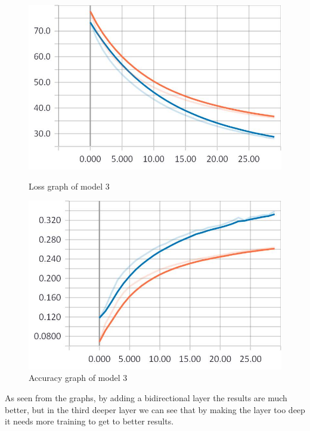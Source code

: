 \begin{figure}
\centering
\begin{minipage}{.5\textwidth}
	\centering
	\includegraphics[width=1\linewidth]{Illustrations/losss4.jpg}
	\caption{Loss graph of model 3}
	\label{fig:loss4}
\end{minipage}%
\begin{minipage}{.5\textwidth}
	\centering
	\includegraphics[width=1\linewidth]{Illustrations/accuracy4.jpg}
	\caption{Accuracy graph of model 3}
	\label{fig:accuracy4}
\end{minipage}
\end{figure}


As seen from the graphs, by adding a bidirectional layer the results are much better, but in the third deeper layer we can see that by making the layer too deep it needs more training to get to better results.


